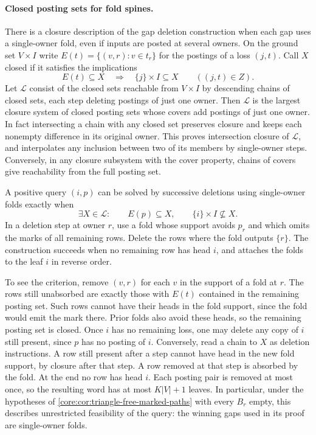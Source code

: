\paragraph{Closed posting sets for fold spines.}
There is a closure description of the gap deletion construction when
each gap uses a single-owner fold, even if inputs are posted at several
owners. On the ground set
$V\times I$ write $E(t)=\{(v,r):v\in t_r\}$ for the postings of a
loss $(j,t)$. Call $X$ closed if it satisfies the implications
\[
 E(t)\subseteq X\quad\Longrightarrow\quad \{j\}\times I\subseteq X
 \qquad ((j,t)\in Z).
\]
Let $\mathcal L$ consist of the closed sets reachable from $V\times I$
by descending chains of closed sets, each step deleting postings of
just one owner. Then $\mathcal L$ is the largest closure system
of closed posting sets whose covers add postings of just one owner.
In fact intersecting a chain with any closed set preserves closure
and keeps each nonempty difference in its original owner. This proves
intersection closure of $\mathcal L$, and interpolates any inclusion
between two of its members by single-owner steps. Conversely, in
any closure subsystem with the cover property, chains of covers give
reachability from the full posting set.

A positive query $(i,p)$ can be solved by successive deletions using
single-owner folds exactly when
\[
 \exists X\in\mathcal L:\qquad E(p)\subseteq X,\qquad
                 \{i\}\times I\not\subseteq X .
\]
In a deletion step at owner $r$, use a fold whose support avoids
$p_r$ and which omits the marks of all remaining rows. Delete the
rows where the fold outputs $\{r\}$. The construction succeeds when
no remaining row has head $i$, and attaches the folds to the leaf
$i$ in reverse order.

To see the criterion, remove $(v,r)$ for each $v$ in the support of
a fold at $r$. The rows still unabsorbed are exactly those with
$E(t)$ contained in the remaining posting set. Such rows cannot
have their heads in the fold support, since the fold would emit the
mark there. Prior folds also avoid these heads, so the remaining
posting set is closed. Once $i$ has no remaining loss, one may
delete any copy of $i$ still present, since $p$ has no posting of
$i$. Conversely, read a chain to $X$ as deletion instructions.
A row still present after a step cannot have head in the new fold
support, by closure after that step. A row removed at that step
is absorbed by the fold. At the end no row has head $i$. Each
posting pair is removed at most once, so the resulting word has
at most $K|V|+1$ leaves.
In particular, under
the hypotheses of \cref{core:cor:triangle-free-marked-paths} with
every $B_r$ empty, this describes unrestricted feasibility of the
query: the winning gaps used in its proof are single-owner folds.

